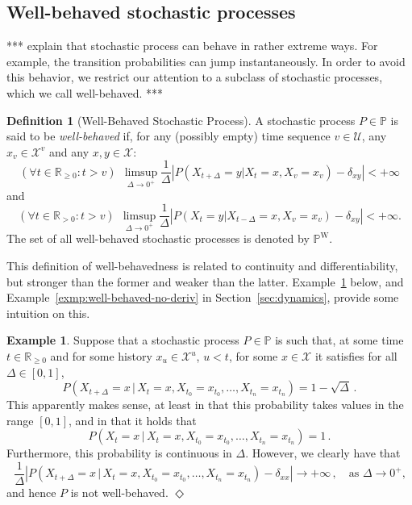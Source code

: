 \documentclass[10pt]{paper}
\theoremstyle{definition}
\newtheorem{exmp}{Example}%
\newtheorem{definition}{Definition}
\newcommand{\reals}{\mathbb{R}}
\newcommand{\realsnonneg}{\reals_{\geq 0}}
\newcommand{\states}{\mathcal{X}}
\newcommand{\processes}{\mathbb{P}}
\newcommand{\wprocesses}{\processes^{\mathrm{W}}}
\newcommand{\abs}[1]{\left\vert #1 \right\vert}
\newcommand{\exampleend}{\hfill$\Diamond$}
\begin{document}
\subsection{Well-behaved stochastic processes}\label{sec:well_behaved}

*** explain that stochastic process can behave in rather extreme ways. For example, the transition probabilities can jump instantaneously. In order to avoid this behavior, we restrict our attention to a subclass of stochastic processes, which we call well-behaved. ***

\begin{definition}[Well-Behaved Stochastic Process]
\label{def:well-behaved}
A stochastic process $P\in\processes$ is said to be \emph{well-behaved} if, for any (possibly empty) time sequence $v\in\mathcal{U}$, any $x_v\in\states^v$ and any $x,y\in\states$:
\begin{equation}\label{eq:def:well-behaved:right}
(\forall t\in\reals_{\geq0}
\colon t> v)~~
\limsup_{\Delta\to 0^{+}}\frac{1}{\Delta}\abs{P(X_{t+\Delta}=y\vert X_t=x, X_v=x_v)-\delta_{xy}}<+\infty
\end{equation}
and
\begin{equation}\label{eq:def:well-behaved:left}
(\forall t\in\reals_{>0}
\colon t> v)~~
\limsup_{\Delta\to 0^{+}}\frac{1}{\Delta}\abs{P(X_{t}=y\vert X_{t-\Delta}=x, X_v=x_v)-\delta_{xy}}<+\infty.
\end{equation}
The set of all well-behaved stochastic processes is denoted by $\wprocesses$.
\end{definition}

This definition of well-behavedness is related to continuity and differentiability, but stronger than the former and weaker than the latter. Example~\ref{exmp:well-behaved} below, and Example~\ref{exmp:well-behaved-no-deriv} in Section~\ref{sec:dynamics}, provide some intuition on this.

\begin{exmp}\label{exmp:well-behaved}
Suppose that a stochastic process $P\in\processes$ is such that, at some time $t\in\realsnonneg$ and for some history $x_u\in\states^u$, $u<t$, for some $x\in\states$ it satisfies for all $\Delta\in[0,1]$,
\begin{equation*}
P(X_{t+\Delta}=x\,\vert\,X_{t}=x,X_{t_0}=x_{t_0},\ldots,X_{t_n}=x_{t_n}) = 1-\sqrt{\Delta}\,.
\end{equation*}
This apparently makes sense, at least in that this probability takes values in the range $[0,1]$, and in that it holds that
\begin{equation*}
P(X_{t}=x\,\vert\,X_{t}=x,X_{t_0}=x_{t_0},\ldots,X_{t_n}=x_{t_n}) = 1\,.
\end{equation*}
Furthermore, this probability is continuous in $\Delta$. However, we clearly have that
\begin{equation*}
\frac{1}{\Delta}\abs{P(X_{t+\Delta}=x\,\vert\,X_{t}=x,X_{t_0}=x_{t_0},\ldots,X_{t_n}=x_{t_n}) - \delta_{xx}} \to +\infty\,,\quad\text{as $\Delta\to0^+$,}
\end{equation*}
and hence $P$ is not well-behaved.
\exampleend
\end{exmp}
\end{document}
